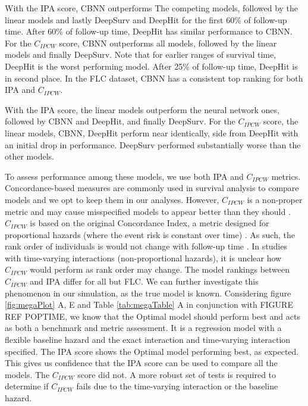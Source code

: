 With the IPA score, CBNN outperforms
The competing models, followed by the linear models and lastly DeepSurv and DeepHit for the first 60\% of follow-up time. 
After 60\% of follow-up time, DeepHit has similar performance to CBNN. For the \(C_{IPCW}\) score, CBNN outperforms all models,
followed by the linear models and finally DeepSurv. Note that for earlier ranges of survival time, DeepHit is the worst performing model. 
After 25\% of follow-up time, DeepHit is in second place. In the FLC dataset, CBNN has a consistent top ranking for both IPA and \(C_{IPCW}\).




 With the IPA score, the linear models
outperform the neural network ones, followed by CBNN and DeepHit, and
finally DeepSurv. For the \(C_{IPCW}\) score, the linear models, CBNN, DeepHit
perform near identically, side from DeepHit with an initial drop in performance.
DeepSurv performed substantially worse than the other models.


To assess performance among these models, we use both IPA and
\(C_{IPCW}\) metrics. Concordance-based measures are commonly used in
survival analysis to compare models and we opt to keep them in our
analyses. However, \(C_{IPCW}\) is a non-proper metric and may cause
misspecified models to appear better than they should
\citep{cindexfails2019}. \(C_{IPCW}\) is based on the original Concordance
Index, a metric designed for proportional hazards (where the event risk is
constant over time) \citep{uno2011}. As such, the rank order of individuals
is would not change with follow-up time \citep{uno2011}. In studies with time-varying interactions (non-proportional hazards),
it is unclear how \(C_{IPCW}\) would perform as rank order may change. 
The model rankings between \(C_{IPCW}\) and IPA differ for all but FLC. We can further investigate this phenomenon
in our simulation, as the true model is known. Considering figure \ref{fig:megaPlot} A, E and
Table \ref{tab:megaTable} A in conjunction with FIGURE REF POPTIME, we know that the Optimal model should perform
best and acts as both a benchmark and metric assessment. It is a regression
model with a flexible baseline hazard and the exact interaction and time-varying interaction
specified. The IPA score shows the Optimal model performing best, as expected. This gives us
confidence that the IPA score can be used to compare all the models. The \(C_{IPCW}\) score did not.
A more robust set of tests is required to determine if \(C_{IPCW}\) fails due to the time-varying interaction or
the baseline hazard.

